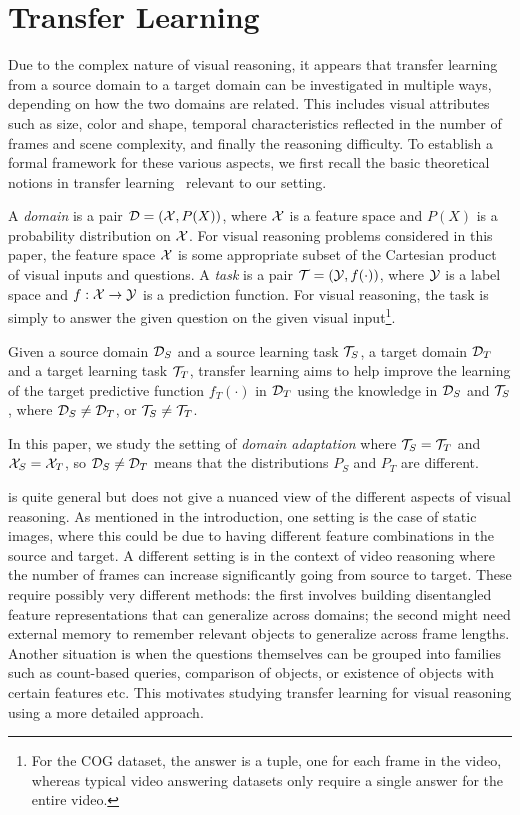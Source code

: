\section{Transfer Learning}
\label{sec:transfer_learning}

Due to the complex nature of visual reasoning, it appears that
transfer learning from a source domain to a target domain can be investigated in
multiple ways, depending on how the two domains are related. This includes visual attributes such as size, color and shape, temporal characteristics reflected in the number of frames and scene complexity, and finally the reasoning difficulty.
To establish a formal framework for these various aspects, we first recall the basic theoretical notions in transfer learning~\cite{pan2009survey} relevant to our setting.

A \emph{domain} is a pair $\mathcal{D} = (\mathcal{X},P(X))$, where $\mathcal{X}$ is a feature space and $P(X)$ is a probability distribution on $\mathcal{X}$.
For visual reasoning problems considered in this paper, the feature space
$\mathcal{X}$ is some appropriate subset of the Cartesian product of visual inputs and questions.
A \emph{task} is a pair $\mathcal{T}= (\mathcal{Y},f(\cdot))$, where $\mathcal{Y}$ is a label space and $f: \mathcal{X} \to \mathcal{Y}$ is a prediction function.
For visual reasoning, the task is simply to answer the
given question on the given visual input\footnote{%
	For the COG dataset, the answer is a tuple, one for each frame in the video, whereas typical video answering datasets only require a single answer for the entire video.}.

\begin{definition}
	\label{defn:transfer}
	Given a source domain $\mathcal{D}_S$ and a source learning task $\mathcal{T}_S$, a target domain $\mathcal{D}_T$ and a target learning task $\mathcal{T}_T$, transfer learning aims to help improve the
	learning of the target predictive function $f_T(\cdot)$ in $\mathcal{D}_T$ using the knowledge  in $\mathcal{D}_S$ and $\mathcal{T}_S$, where $\mathcal{D}_S \ne \mathcal{D}_T$, or $\mathcal{T}_S \ne \mathcal{T}_T$.
\end{definition}
In this paper, we study the setting of \emph{domain adaptation}
where $\mathcal{T}_S = \mathcal{T}_T$ and $\mathcal{X}_S = \mathcal{X}_T$, so $\mathcal{D}_S \ne \mathcal{D}_T$ means that the distributions $P_S$ and $P_T$ are different.

 is quite general but does not give a nuanced view of 
the different aspects of visual reasoning.
As mentioned in the introduction, one setting is the case of static images,
where this could be due to having different feature combinations in the source and target.
A different setting is in the context of video reasoning where the number of frames can increase significantly going from source to target.
These require possibly very different methods: the first involves building disentangled feature representations that can generalize across
domains; the second might need external memory to remember relevant objects to generalize across frame lengths.
Another situation is when the questions themselves can be grouped into families such as count-based queries,
comparison of objects, or existence of objects with certain features etc.
This motivates studying transfer learning for visual reasoning using a more detailed approach.

